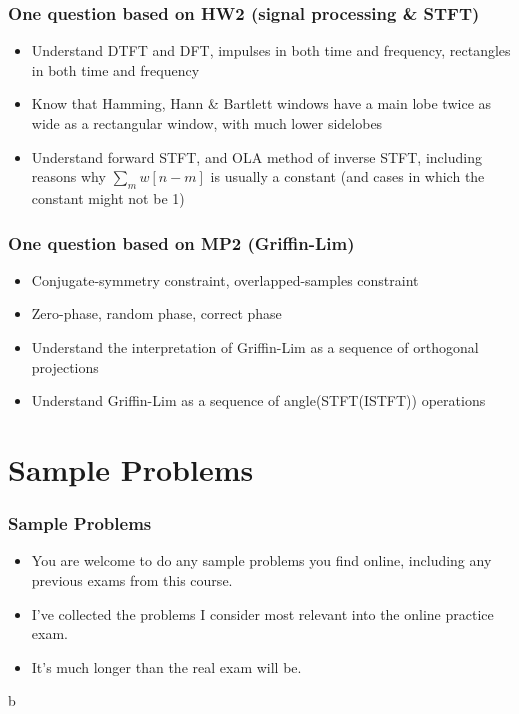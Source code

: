 \documentclass{beamer}
\begin{document}
\begin{frame}
  \frametitle{One question based on HW2 (signal processing \& STFT)}

  \begin{itemize}
  \item Understand DTFT and DFT, impulses in both time and frequency,
    rectangles in both time and frequency
  \item Know that Hamming, Hann \& Bartlett windows have a main lobe
    twice as wide as a rectangular window, with much lower sidelobes
  \item Understand forward STFT, and OLA method of inverse STFT,
    including reasons why $\sum_m w[n-m]$ is usually a constant (and
    cases in which the constant might not be 1)
  \end{itemize}
\end{frame}

\begin{frame}
  \frametitle{One question based on MP2 (Griffin-Lim)}

  \begin{itemize}
  \item Conjugate-symmetry constraint, overlapped-samples constraint
  \item Zero-phase, random phase, correct phase
  \item Understand the interpretation of Griffin-Lim as a sequence of
    orthogonal projections
  \item Understand Griffin-Lim as a sequence of angle(STFT(ISTFT))
    operations
  \end{itemize}
\end{frame}

\section[Sample Problems]{Sample Problems}
\setcounter{subsection}{1}

\begin{frame}
  \frametitle{Sample Problems}

  \begin{itemize}
  \item You are welcome to do any sample problems you find online,
    including any previous exams from this course.
  \item I've collected the problems I consider most relevant into the
    online practice exam.
  \item It's much longer than the real exam will be.
  \end{itemize}
\end{frame}
b
\end{document}
